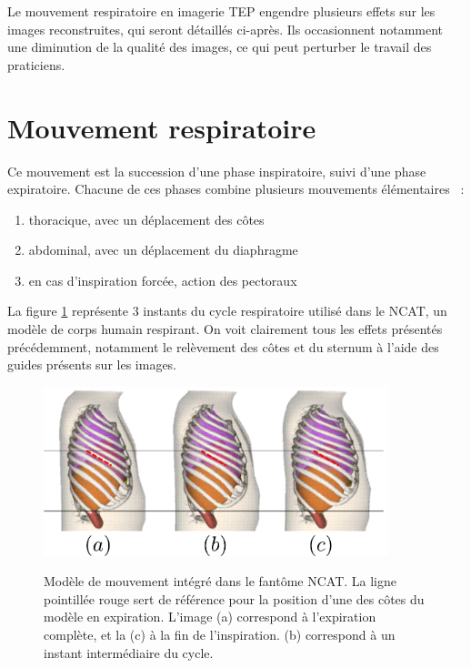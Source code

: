Le mouvement respiratoire en imagerie TEP engendre plusieurs effets sur les images reconstruites, qui seront détaillés ci-après. Ils occasionnent notamment une diminution de la qualité des images, ce qui peut perturber le travail des praticiens.

\section{Mouvement respiratoire}

Ce mouvement est la succession d'une phase inspiratoire, suivi d'une phase expiratoire. Chacune de ces phases combine plusieurs mouvements élémentaires~\cite{servant2007cours} :
 
\begin{enumerate}
 \item thoracique, avec un déplacement des côtes
 \item abdominal, avec un déplacement du diaphragme
 \item en cas d'inspiration forcée, action des pectoraux
\end{enumerate}

La figure \ref{fig:respiXCAT} représente 3 instants du cycle respiratoire utilisé dans le NCAT, un modèle de corps humain respirant. On voit clairement tous les effets présentés précédemment, notamment le relèvement des côtes et du sternum à l’aide des guides présents sur les images.

\begin{figure}[h!]
    \begin{center}
            \includegraphics[width=10cm]{images/mvtRespi} \\
    \end{center}
    \caption{Modèle de mouvement intégré dans le fantôme NCAT. La ligne pointillée rouge sert de référence pour la position d'une des côtes du modèle en expiration. L'image (a) correspond à l'expiration complète, et la (c) à la fin de l'inspiration. (b) correspond à un instant intermédiaire du cycle. }
    \label{fig:respiXCAT}
\end{figure}


